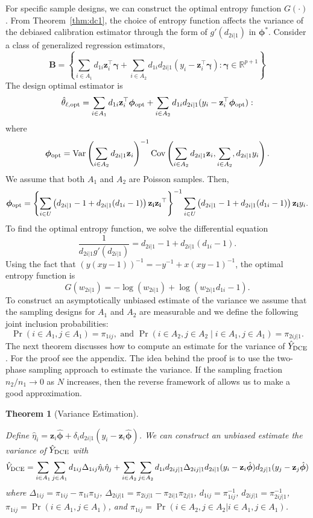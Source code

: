 \documentclass[12pt]{article}
\newtheorem{theorem}{Theorem}
\newcommand{\Cov}{{\text{Cov}}}
\newcommand{\Var}{{\text{Var}}}
\newcommand{\R}{\mathbb{R}}
\renewcommand{\bf}[1]{\mathbf{#1}}
\begin{document}
For specific sample designs, we can construct the optimal entropy function
$G(\cdot)$. From Theorem~\ref{thm:dc1}, the choice of entropy function affects
the variance of the debiased calibration estimator through the form of $g'(d_{2i|1})$
in $\bm \phi^*$. Consider a class of generalized regression estimators,
$$
\mathbf{B} = 
\left\{\sum_{i \in A_1} d_{1i} \bf{z}_i^\top \bm \gamma + 
\sum_{i \in A_2} d_{1i}d_{2i|1}(y_i - \bf{z}_i^\top \bm \gamma):
\bm \gamma \in \R^{p+1}\right\}
$$
The design optimal estimator is 
$$
\hat \theta_{\ell, \rm{opt}} = 
\sum_{i \in A_1} d_{1i} \bf{z}_i^\top \bm \phi_{\rm opt} + 
\sum_{i \in A_2} d_{1i}d_{2i|1}(y_i - \bf{z}_i^\top \bm \phi_{\rm opt}):
$$
where 
$$
\bm \phi_{\rm opt} = 
\Var\left(\sum_{i \in A_2} d_{2i|1} \bf{z}_i\right)^{-1} 
\Cov\left(\sum_{i \in A_2} d_{2i|1} \bf{z}_i, \sum_{i \in A_2}, d_{2i|1} y_i \right).
$$
We assume that both $A_1$ and $A_2$ are Poisson samples. Then,
$$
\bm \phi_{\rm opt} = 
\left\{
\sum_{i \in U} \left(d_{2i|1} - 1 + d_{2i|1}(d_{1i} - 1)\right) \bf{z_i}\bf{z_i}^\top
\right\}^{-1}
\sum_{i \in U} \left(d_{2i|1} - 1 + d_{2i|1}(d_{1i} - 1)\right) \bf{z_i} y_i.
$$
To find the optimal entropy function, we solve the differential equation
$$
\frac{1}{d_{2i|1} g'(d_{2i|1})} = d_{2i|1} - 1 + d_{2i|1}(d_{1i} - 1).
$$
Using the fact that $(y(xy-1))^{-1} = -y^{-1} + x(xy-1)^{-1}$, the optimal
entropy function is 
$$
G(w_{2i|1}) = - \log(w_{2i|1}) + \log(w_{2i|1}d_{1i} - 1).
$$
To construct an asymptotically unbiased estimate of the variance we assume that
the sampling designs for $A_1$ and $A_2$ are measurable and we define the
following joint inclusion probabilities:
$$
\Pr(i \in A_1, j \in A_1) = \pi_{1ij}, \text{ and }
\Pr(i \in A_2, j \in A_2 \mid i \in A_1, j \in A_1) = \pi_{2ij|1}.
$$
The next theorem discusses how to compute an estimate for the variance of 
$\hat Y_{\rm DCE}$. For the proof see the appendix. The idea behind the proof is
to use the two-phase sampling approach to estimate the variance. If the sampling
fraction $n_2 / n_1 \to 0$ as $N$ increases, then the reverse framework of
\cite{fay1992inferences} allows us to make a good approximation.

\begin{theorem}[Variance Estimation]\label{thm:mainvar}

  Define $\hat \eta_i = \bf z_i \hat{\bm \phi} + 
  \delta_i d_{2i|1}(y_i - \bf z_i \hat{\bm \phi})$.
  We can construct an unbiased estimate the variance of $\hat Y_{\rm DCE}$ with
  $$
  \hat V_{\rm DCE} 
  = \sum_{i \in A_1} \sum_{j \in A_1} d_{1ij} \Delta_{1ij}
  \hat \eta_i \hat \eta_j
  + \sum_{i \in A_2} \sum_{j \in A_2} d_{1i} d_{2ij|1}\Delta_{2ij|1}
  d_{2i|1}(y_i - \bf z_i \hat{\bm \phi})
  d_{2j|1}(y_j - \bf z_j \hat{\bm \phi})
  $$
  where $\Delta_{1ij} = \pi_{1ij} - \pi_{1i}\pi_{1j}$,
  $\Delta_{2ij|1} = \pi_{2ij|1} - \pi_{2i|1}\pi_{2j|1}$,
  $d_{1ij} = \pi_{1ij}^{-1}$, $d_{2ij|1} = \pi_{2ij|1}^{-1}$,
  $\pi_{1ij} = \Pr(i \in A_1, j \in A_1)$, and 
  $\pi_{1ij} = \Pr(i \in A_2, j \in A_2 | i \in A_1, j \in A_1)$.
\end{theorem}
\end{document}
